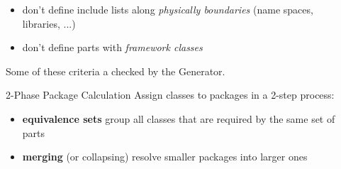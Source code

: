 \documentclass[final]{beamer}
\newlength{\sepwid}
\newlength{\onecolwid}
\newlength{\twocolwid}
\begin{document}
\begin{frame}[t]
\begin{columns}[t]


    \begin{column}{\sepwid}\end{column}			%

    \begin{column}{\twocolwid}  %
    \begin{columns}[t,totalwidth=\twocolwid] %
    \begin{column}{\onecolwid}
      \begin{block}{}
        \begin{itemize}
          \item don't define include lists along \textit{physically boundaries} (name
            spaces, libraries, ...)
          \item don't define parts with \textit{framework classes}
        \end{itemize}
        Some of these criteria a checked by the Generator.
      \end{block}

      \begin{block}{2-Phase Package Calculation}
        Assign classes to packages in a 2-step process:
        \begin{itemize}
          \item \textbf{equivalence sets} group all classes that are required by the
            same set of parts
          \item \textbf{merging} (or collapsing) resolve smaller packages into
            larger ones
        \end{itemize}
      \end{block}
    \end{column}


\end{columns}
\end{column}
\end{columns}
\end{frame}
\end{document}

